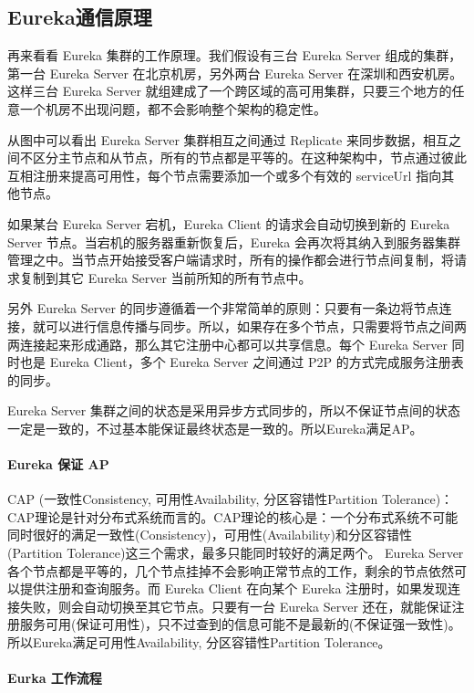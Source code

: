 \documentclass[../../../interview-questions.tex]{subfiles}
\begin{document}
\subsection{Eureka通信原理}

再来看看 Eureka 集群的工作原理。我们假设有三台 Eureka Server 组成的集群，第一台 Eureka Server 在北京机房，另外两台 Eureka Server 在深圳和西安机房。这样三台 Eureka Server 就组建成了一个跨区域的高可用集群，只要三个地方的任意一个机房不出现问题，都不会影响整个架构的稳定性。

从图中可以看出 Eureka Server 集群相互之间通过 Replicate 来同步数据，相互之间不区分主节点和从节点，所有的节点都是平等的。在这种架构中，节点通过彼此互相注册来提高可用性，每个节点需要添加一个或多个有效的 serviceUrl 指向其他节点。

如果某台 Eureka Server 宕机，Eureka Client 的请求会自动切换到新的 Eureka Server 节点。当宕机的服务器重新恢复后，Eureka 会再次将其纳入到服务器集群管理之中。当节点开始接受客户端请求时，所有的操作都会进行节点间复制，将请求复制到其它 Eureka Server 当前所知的所有节点中。

另外 Eureka Server 的同步遵循着一个非常简单的原则：只要有一条边将节点连接，就可以进行信息传播与同步。所以，如果存在多个节点，只需要将节点之间两两连接起来形成通路，那么其它注册中心都可以共享信息。每个 Eureka Server 同时也是 Eureka Client，多个 Eureka Server 之间通过 P2P 的方式完成服务注册表的同步。

Eureka Server 集群之间的状态是采用异步方式同步的，所以不保证节点间的状态一定是一致的，不过基本能保证最终状态是一致的。所以Eureka满足AP。

\paragraph{Eureka 保证 AP}

CAP (一致性Consistency, 可用性Availability, 分区容错性Partition Tolerance)：CAP理论是针对分布式系统而言的。CAP理论的核心是：一个分布式系统不可能同时很好的满足一致性(Consistency)，可用性(Availability)和分区容错性(Partition Tolerance)这三个需求，最多只能同时较好的满足两个。
Eureka Server 各个节点都是平等的，几个节点挂掉不会影响正常节点的工作，剩余的节点依然可以提供注册和查询服务。而 Eureka Client 在向某个 Eureka 注册时，如果发现连接失败，则会自动切换至其它节点。只要有一台 Eureka Server 还在，就能保证注册服务可用(保证可用性)，只不过查到的信息可能不是最新的(不保证强一致性)。所以Eureka满足可用性Availability, 分区容错性Partition Tolerance。

\paragraph{Eurka 工作流程}
\end{document}
